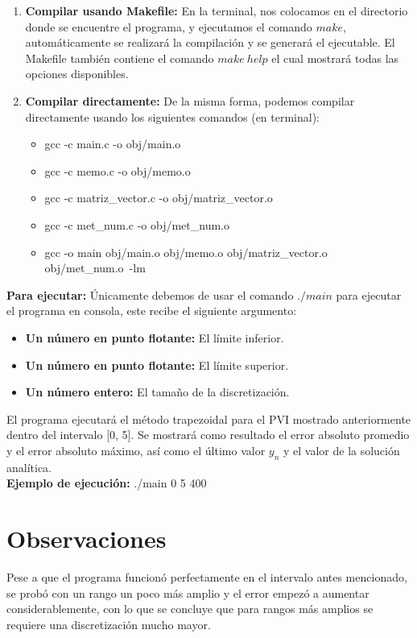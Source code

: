 \documentclass[12pt]{article}
\begin{document}
\begin{enumerate}
	\item \textbf{Compilar usando Makefile:} En la terminal, nos colocamos en el directorio donde se encuentre el programa, y ejecutamos el comando $make$, automáticamente se realizará la compilación y se generará el ejecutable. El Makefile también contiene el comando $make\ help$ el cual mostrará todas las opciones disponibles.
	\item \textbf{Compilar directamente:} De la misma forma, podemos compilar directamente usando los siguientes comandos (en terminal):
	\begin{itemize}
		\item gcc -c main.c -o obj/main.o
		\item gcc -c memo.c -o obj/memo.o
		\item gcc -c matriz\_vector.c -o obj/matriz\_vector.o
		\item gcc -c met\_num.c -o obj/met\_num.o
		\item gcc -o main obj/main.o obj/memo.o obj/matriz\_vector.o obj/met\_num.o\ -lm
	\end{itemize}
\end{enumerate}

\textbf{Para ejecutar:} Únicamente debemos de usar el comando $./main$ para ejecutar el programa en consola, este recibe el siguiente argumento:
\begin{itemize}
	\item \textbf{Un número en punto flotante:} El límite inferior.
	\item \textbf{Un número en punto flotante:} El límite superior.
	\item \textbf{Un número entero:} El tamaño de la discretización.
\end{itemize}

El programa ejecutará el método trapezoidal para el PVI mostrado anteriormente dentro del intervalo [0, 5]. Se mostrará como resultado el error absoluto promedio y el error absoluto máximo, así como el último valor $y_n$ y el valor de la solución analítica.\\

\textbf{Ejemplo de ejecución:} ./main 0 5 400\\

\section{Observaciones}
Pese a que el programa funcionó perfectamente en el intervalo antes mencionado, se probó con un rango un poco más amplio y el error empezó a aumentar considerablemente, con lo que se concluye que para rangos más amplios se requiere una discretización mucho mayor.
\end{document}
